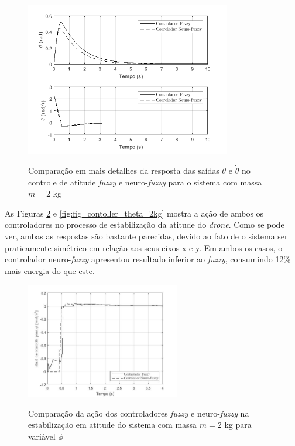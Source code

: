\begin{figure}[!htb]
    \centering
    \caption{Comparação em mais detalhes da resposta das saídas $\theta$ e $\dot{\theta}$ no controle de atitude \textit{fuzzy} e neuro-\textit{fuzzy} para o sistema com massa $m=2$ kg}
    \includegraphics[width=0.8\textwidth]{./04-figuras/resultados/novos/atitude_theta_thetadot_2kg_10s}
    \label{fig:atitude_theta_thetadot_2kg_10s}
\end{figure}

As Figuras \ref{fig:fig_contoller_phi_2kg} e \ref{fig:fig_contoller_theta_2kg} mostra a ação de ambos os controladores no processo de estabilização da atitude do \textit{drone}. Como se pode ver, ambas as respostas são bastante parecidas, devido ao fato de o sistema ser praticamente simétrico em relação aos seus eixos x e y. Em ambos os casos, o controlador neuro-\textit{fuzzy} apresentou resultado inferior ao \textit{fuzzy}, consumindo 12\% mais energia do que este.

\begin{figure}[!htb]
    \centering
    \caption{Comparação da ação dos controladores \textit{fuzzy} e neuro-\textit{fuzzy} na estabilização em atitude do sistema com massa $m=2$ kg para variável $\phi$}
    \includegraphics[width=0.6\textwidth]{./04-figuras/figuras_pos_banca/3-atitude2kg/fig_contoller_phi_2kg}
    \label{fig:fig_contoller_phi_2kg}
\end{figure}

